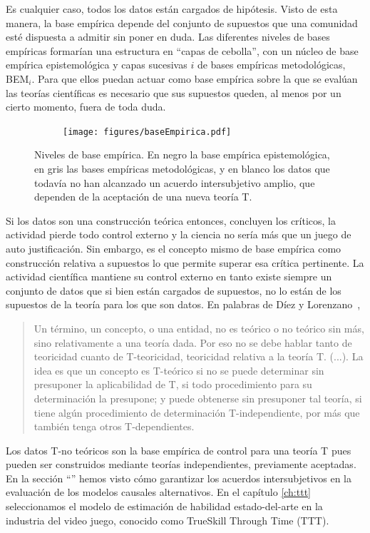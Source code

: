 \documentclass[a4paper,10pt]{book}
\theoremstyle{definition}
\begin{document}
Es cualquier caso, todos los datos est\'an cargados de hip\'otesis.
%
Visto de esta manera, la base emp\'irica depende del conjunto de supuestos que una comunidad esté dispuesta a admitir sin poner en duda.
%
Las diferentes niveles de bases emp\'iricas formar\'ian una estructura en ``capas de cebolla'', con un n\'ucleo de base emp\'irica epistemol\'ogica y capas sucesivas $i$ de bases emp\'iricas metodol\'ogicas, BEM$_i$. 
%
Para que ellos puedan actuar como base emp\'irica sobre la que se eval\'uan las teor\'ias cient\'ificas es necesario que sus supuestos queden, al menos por un cierto momento, fuera de toda duda.
%
\begin{figure}[ht!]
    \centering
    \begin{subfigure}[b]{0.48\textwidth}
    \texttt{[image: figures/baseEmpirica.pdf]}
    \end{subfigure}
    \caption{Niveles de base emp\'irica. En negro la base emp\'irica epistemol\'ogica, en gris las bases emp\'iricas metodol\'ogicas, y en blanco los datos que todav\'ia no han alcanzado un acuerdo intersubjetivo amplio, que dependen de la aceptaci\'on de una nueva teor\'ia T. }
\end{figure}


Si los datos son una construcci\'on te\'orica entonces, concluyen los cr\'iticos, la actividad pierde todo control externo y la ciencia no ser\'ia más que un juego de auto justificaci\'on.
%
Sin embargo, es el concepto mismo de base emp\'irica como construcci\'on relativa a supuestos lo que permite superar esa cr\'itica pertinente.
%
La actividad cient\'ifica mantiene su control externo en tanto existe siempre un conjunto de datos que si bien están cargados de supuestos, no lo están de los supuestos de la teor\'ia para los que son datos.
%
En palabras de D\'iez y Lorenzano~\cite{lorenzano2002-concepcionEstructuralista},
%
\begin{quotation}
Un término, un concepto, o una entidad, no es te\'orico o no te\'orico sin más, sino relativamente a una teor\'ia dada.
Por eso no se debe hablar tanto de teoricidad cuanto de T-teoricidad, teoricidad relativa a la teor\'ia T. (...).
La idea es que un concepto es T-te\'orico si no se puede determinar sin presuponer la aplicabilidad de T, si todo procedimiento para su determinaci\'on la presupone; y puede obtenerse sin presuponer tal teor\'ia, si tiene alg\'un procedimiento de determinaci\'on T-independiente, por más que también tenga otros T-dependientes.
\end{quotation}
%
Los datos T-no te\'oricos son la base emp\'irica de control para una teor\'ia T pues pueden ser construidos mediante teor\'ias independientes, previamente aceptadas.
%
En la secci\'on ``'' hemos visto c\'omo garantizar los acuerdos intersubjetivos en la evaluaci\'on de los modelos causales alternativos.
%
En el cap\'itulo \ref{ch:ttt} seleccionamos el modelo de estimaci\'on de habilidad estado-del-arte en la industria del video juego, conocido como TrueSkill Through Time (TTT).
\end{document}
